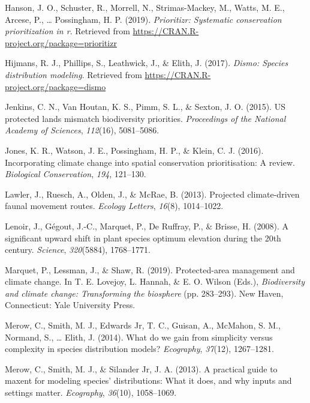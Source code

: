 \documentclass[]{article}
\begin{document}
\leavevmode\hypertarget{ref-Hanson2019}{}%
Hanson, J. O., Schuster, R., Morrell, N., Strimas-Mackey, M., Watts, M. E., Arcese, P., \ldots{} Possingham, H. P. (2019). \emph{Prioritizr: Systematic conservation prioritization in r}. Retrieved from \url{https://CRAN.R-project.org/package=prioritizr}

\leavevmode\hypertarget{ref-Hijmans_Dismo}{}%
Hijmans, R. J., Phillips, S., Leathwick, J., \& Elith, J. (2017). \emph{Dismo: Species distribution modeling}. Retrieved from \url{https://CRAN.R-project.org/package=dismo}

\leavevmode\hypertarget{ref-jenkins2015us}{}%
Jenkins, C. N., Van Houtan, K. S., Pimm, S. L., \& Sexton, J. O. (2015). US protected lands mismatch biodiversity priorities. \emph{Proceedings of the National Academy of Sciences}, \emph{112}(16), 5081--5086.

\leavevmode\hypertarget{ref-jones2016incorporating}{}%
Jones, K. R., Watson, J. E., Possingham, H. P., \& Klein, C. J. (2016). Incorporating climate change into spatial conservation prioritisation: A review. \emph{Biological Conservation}, \emph{194}, 121--130.

\leavevmode\hypertarget{ref-lawler2013projected}{}%
Lawler, J., Ruesch, A., Olden, J., \& McRae, B. (2013). Projected climate-driven faunal movement routes. \emph{Ecology Letters}, \emph{16}(8), 1014--1022.

\leavevmode\hypertarget{ref-lenoir2008significant}{}%
Lenoir, J., Gégout, J.-C., Marquet, P., De Ruffray, P., \& Brisse, H. (2008). A significant upward shift in plant species optimum elevation during the 20th century. \emph{Science}, \emph{320}(5884), 1768--1771.

\leavevmode\hypertarget{ref-marquet_2019}{}%
Marquet, P., Lessman, J., \& Shaw, R. (2019). Protected-area management and climate change. In T. E. Lovejoy, L. Hannah, \& E. O. Wilson (Eds.), \emph{Biodiversity and climate change: Transforming the biosphere} (pp. 283--293). New Haven, Connecticut: Yale University Press.

\leavevmode\hypertarget{ref-merow2014we}{}%
Merow, C., Smith, M. J., Edwards Jr, T. C., Guisan, A., McMahon, S. M., Normand, S., \ldots{} Elith, J. (2014). What do we gain from simplicity versus complexity in species distribution models? \emph{Ecography}, \emph{37}(12), 1267--1281.

\leavevmode\hypertarget{ref-merow2013practical}{}%
Merow, C., Smith, M. J., \& Silander Jr, J. A. (2013). A practical guide to maxent for modeling species' distributions: What it does, and why inputs and settings matter. \emph{Ecography}, \emph{36}(10), 1058--1069.
\end{document}
